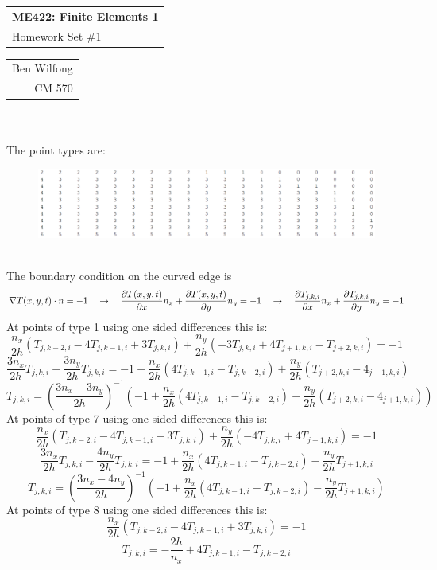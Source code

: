 \documentclass{amsart}
\def\name{Ben Wilfong} %
\def\CM{570} %
\begin{document}
	\noindent
	\thispagestyle{firststyle}
	\begin{tabular}{l}
		{\LARGE \textbf{ME422: Finite Elements 1} }\\
		{\Large Homework Set \#1}
	\end{tabular} \hfill \begin{tabular}{r}
		\name \\
		CM \CM
	\end{tabular}
	\noindent\makebox[\linewidth]{\rule{\textwidth}{1pt}} \\~\\
	The point types are:
	\begin{figure}[h]
		\centering
		\includegraphics[width=\textwidth]{pointTypes.png}
	\end{figure} \\
	The boundary condition on the curved edge is
	\[\nabla T(x,y,t)\cdot n = -1 \quad \rightarrow \quad \pdiff[T(x,y,t)]{x}n_x + \pdiff[T(x,y,t)]{y}n_y = -1 \quad \rightarrow \quad \pdiff[T_{j,k,i}]{x}n_x + \pdiff[T_{j,k,i}]{y}n_y = -1\]
	At points of type 1 using one sided differences this is:
	\[\frac{n_x}{2h}\left(T_{j,k-2,i} - 4T_{j,k-1,i} + 3T_{j,k,i}\right) + \frac{n_y}{2h}\left(-3T_{j,k,i} + 4T_{j+1,k,i} - T_{j+2,k,i}\right) = -1\]
	\[\frac{3n_x}{2h}T_{j,k,i} - \frac{3n_y}{2h}T_{j,k,i} = -1 + \frac{n_x}{2h}(4T_{j,k-1,i} - T_{j,k-2,i}) + \frac{n_y}{2h}(T_{j+2,k,i} - 4_{j+1,k,i})\]
	\[T_{j,k,i} = \left(\frac{3n_x-3n_y}{2h}\right)^{-1}\left(-1 + \frac{n_x}{2h}(4T_{j,k-1,i} - T_{j,k-2,i}) + \frac{n_y}{2h}(T_{j+2,k,i} - 4_{j+1,k,i})\right)\]
	\noindent At points of type 7 using one sided differences this is:
	\[\frac{n_x}{2h}\left(T_{j,k-2,i} - 4T_{j,k-1,i} + 3T_{j,k,i}\right) + \frac{n_y}{2h}\left(-4T_{j,k,i} + 4T_{j+1,k,i}\right) = -1\]
	\[\frac{3n_x}{2h}T_{j,k,i} - \frac{4n_y}{2h}T_{j,k,i} = -1 + \frac{n_x}{2h}(4T_{j,k-1,i} - T_{j,k-2,i}) - \frac{n_y}{2h}T_{j+1,k,i}\]
	\[T_{j,k,i} = \left(\frac{3n_x-4n_y}{2h}\right)^{-1}\left(-1 + \frac{n_x}{2h}(4T_{j,k-1,i} - T_{j,k-2,i}) - \frac{n_y}{2h}T_{j+1,k,i}\right)\]
	\noindent At points of type 8 using one sided differences this is:
	\[\frac{n_x}{2h}\left(T_{j,k-2,i} - 4T_{j,k-1,i} + 3T_{j,k,i}\right) = -1\]
	\[T_{j,k,i} = -\frac{2h}{n_x} + 4T_{j,k-1,i} - T_{j,k-2,i} \]
\end{document}
